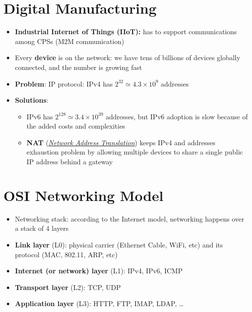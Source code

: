 \documentclass[
  letterpaper,
  DIV=11,
  numbers=noendperiod]{scrartcl}
\providecommand{\tightlist}{%
  \setlength{\itemsep}{0pt}\setlength{\parskip}{0pt}}
\begin{document}
\section{Digital Manufacturing}\label{digital-manufacturing-2}

\begin{itemize}
\tightlist
\item
  \textbf{Industrial Internet of Things (IIoT):} has to support
  communications among CPSs (M2M communication)
\item
  Every \textbf{device} is on the network: we have tens of billions of
  devices globally connected, and the number is growing fast
\item
  \textbf{Problem}: IP protocol: IPv4 has
  \(2^{32} \simeq 4.3 \times 10^9\) addresses
\item
  \textbf{Solutions}:

  \begin{itemize}
  \tightlist
  \item
    IPv6 has \(2^{128} \simeq 3.4 \times 10^{39}\) addresses, but IPv6
    adoption is slow because of the added costs and complexities
  \item
    \textbf{NAT}
    (\href{https://en.wikipedia.org/wiki/Network_address_translation}{\emph{Network
    Address Translation}}) keeps IPv4 and addresses exhaustion problem
    by allowing multiple devices to share a single public IP address
    behind a gateway
  \end{itemize}
\end{itemize}

\section{OSI Networking Model}\label{osi-networking-model}

\begin{itemize}
\tightlist
\item
  Networking stack: according to the Internet model, networking happens
  over a stack of 4 layers
\end{itemize}

\begin{itemize}
\tightlist
\item
  \textbf{Link layer} (L0): physical carrier (Ethernet Cable, WiFi, etc)
  and its protocol (MAC, 802.11, ARP, etc)
\item
  \textbf{Internet (or network) layer} (L1): IPv4, IPv6, ICMP
\item
  \textbf{Transport layer} (L2): TCP, UDP
\item
  \textbf{Application layer} (L3): HTTP, FTP, IMAP, LDAP, \ldots{}
\end{itemize}
\end{document}
